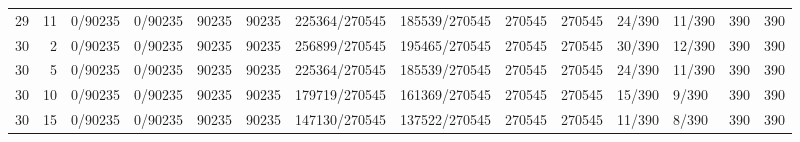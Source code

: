 \begin{tabular}{rrllrrllrrllrr}
29 & 11 &         0/90235 &    0/90235 &          90235 &      90235 & 225364/270545 & 185539/270545 &         270545 &     270545 &      24/390 &     11/390 &        390 &        390 \\
30 &  2 &         0/90235 &    0/90235 &          90235 &      90235 & 256899/270545 & 195465/270545 &         270545 &     270545 &      30/390 &     12/390 &        390 &        390 \\
30 &  5 &         0/90235 &    0/90235 &          90235 &      90235 & 225364/270545 & 185539/270545 &         270545 &     270545 &      24/390 &     11/390 &        390 &        390 \\
30 & 10 &         0/90235 &    0/90235 &          90235 &      90235 & 179719/270545 & 161369/270545 &         270545 &     270545 &      15/390 &      9/390 &        390 &        390 \\
30 & 15 &         0/90235 &    0/90235 &          90235 &      90235 & 147130/270545 & 137522/270545 &         270545 &     270545 &      11/390 &      8/390 &        390 &        390 \\
\bottomrule
\end{tabular}
